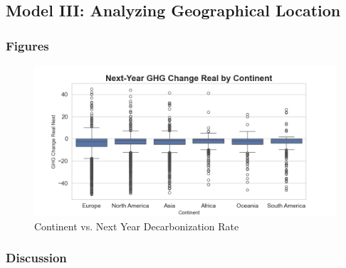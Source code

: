 \subsection{Model III: Analyzing Geographical Location}




\subsubsection{Figures}

\begin{figure}[H]
\centering
  \includegraphics[width=\textwidth]{figures/ghg_change_real_next_by_continent.png}
\caption{Continent vs. Next Year Decarbonization Rate}
\label{fig:continent_vs_ghg_change_real_next}
\end{figure}

\subsubsection{Discussion}

